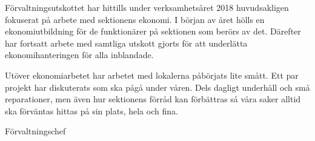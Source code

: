 \documentclass[../_main/handlingar.tex]{subfiles}
\begin{document}
Förvaltningsutskottet har hittills under verksamhetsåret 2018 huvudsakligen fokuserat på arbete med sektionens ekonomi. I början av året hölls en ekonomiutbildning för de funktionärer på sektionen som berörs av det. Därefter har fortsatt arbete med samtliga utskott gjorts för att underlätta ekonomihanteringen för alla inblandade.

Utöver ekonomiarbetet har arbetet med lokalerna påbörjats lite smått. Ett par projekt har diskuterats som ska pågå under våren. Dels dagligt underhåll och små reparationer, men även hur sektionens förråd kan förbättras så våra saker alltid ska förväntas hittas på sin plats, hela och fina.
\begin{signatures}{1}
    \mvh
    \signature{Magnus Lundh}{Förvaltningschef}
\end{signatures}
\end{document}

